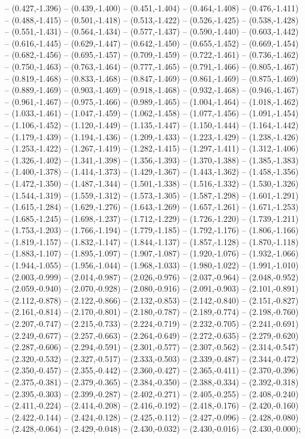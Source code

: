 -- (0.427,-1.396) -- (0.439,-1.400) -- (0.451,-1.404) -- (0.464,-1.408) -- (0.476,-1.411) -- (0.488,-1.415) -- (0.501,-1.418) -- (0.513,-1.422) -- (0.526,-1.425) -- (0.538,-1.428) -- (0.551,-1.431) -- (0.564,-1.434) -- (0.577,-1.437) -- (0.590,-1.440) -- (0.603,-1.442) -- (0.616,-1.445) -- (0.629,-1.447) -- (0.642,-1.450) -- (0.655,-1.452) -- (0.669,-1.454) -- (0.682,-1.456) -- (0.695,-1.457) -- (0.709,-1.459) -- (0.722,-1.461) -- (0.736,-1.462) -- (0.750,-1.463) -- (0.763,-1.464) -- (0.777,-1.465) -- (0.791,-1.466) -- (0.805,-1.467) -- (0.819,-1.468) -- (0.833,-1.468) -- (0.847,-1.469) -- (0.861,-1.469) -- (0.875,-1.469) -- (0.889,-1.469) -- (0.903,-1.469) -- (0.918,-1.468) -- (0.932,-1.468) -- (0.946,-1.467) -- (0.961,-1.467) -- (0.975,-1.466) -- (0.989,-1.465) -- (1.004,-1.464) -- (1.018,-1.462) -- (1.033,-1.461) -- (1.047,-1.459) -- (1.062,-1.458) -- (1.077,-1.456) -- (1.091,-1.454) -- (1.106,-1.452) -- (1.120,-1.449) -- (1.135,-1.447) -- (1.150,-1.444) -- (1.164,-1.442) -- (1.179,-1.439) -- (1.194,-1.436) -- (1.209,-1.433) -- (1.223,-1.429) -- (1.238,-1.426) -- (1.253,-1.422) -- (1.267,-1.419) -- (1.282,-1.415) -- (1.297,-1.411) -- (1.312,-1.406) -- (1.326,-1.402) -- (1.341,-1.398) -- (1.356,-1.393) -- (1.370,-1.388) -- (1.385,-1.383) -- (1.400,-1.378) -- (1.414,-1.373) -- (1.429,-1.367) -- (1.443,-1.362) -- (1.458,-1.356) -- (1.472,-1.350) -- (1.487,-1.344) -- (1.501,-1.338) -- (1.516,-1.332) -- (1.530,-1.326) -- (1.544,-1.319) -- (1.559,-1.312) -- (1.573,-1.305) -- (1.587,-1.298) -- (1.601,-1.291) -- (1.615,-1.284) -- (1.629,-1.276) -- (1.643,-1.269) -- (1.657,-1.261) -- (1.671,-1.253) -- (1.685,-1.245) -- (1.698,-1.237) -- (1.712,-1.229) -- (1.726,-1.220) -- (1.739,-1.211) -- (1.753,-1.203) -- (1.766,-1.194) -- (1.779,-1.185) -- (1.792,-1.176) -- (1.806,-1.166) -- (1.819,-1.157) -- (1.832,-1.147) -- (1.844,-1.137) -- (1.857,-1.128) -- (1.870,-1.118) -- (1.883,-1.107) -- (1.895,-1.097) -- (1.907,-1.087) -- (1.920,-1.076) -- (1.932,-1.066) -- (1.944,-1.055) -- (1.956,-1.044) -- (1.968,-1.033) -- (1.980,-1.022) -- (1.991,-1.010) -- (2.003,-0.999) -- (2.014,-0.987) -- (2.026,-0.976) -- (2.037,-0.964) -- (2.048,-0.952) -- (2.059,-0.940) -- (2.070,-0.928) -- (2.080,-0.916) -- (2.091,-0.903) -- (2.101,-0.891) -- (2.112,-0.878) -- (2.122,-0.866) -- (2.132,-0.853) -- (2.142,-0.840) -- (2.151,-0.827) -- (2.161,-0.814) -- (2.170,-0.801) -- (2.180,-0.787) -- (2.189,-0.774) -- (2.198,-0.760) -- (2.207,-0.747) -- (2.215,-0.733) -- (2.224,-0.719) -- (2.232,-0.705) -- (2.241,-0.691) -- (2.249,-0.677) -- (2.257,-0.663) -- (2.264,-0.649) -- (2.272,-0.635) -- (2.279,-0.620) -- (2.287,-0.606) -- (2.294,-0.591) -- (2.301,-0.577) -- (2.307,-0.562) -- (2.314,-0.547) -- (2.320,-0.532) -- (2.327,-0.517) -- (2.333,-0.503) -- (2.339,-0.487) -- (2.344,-0.472) -- (2.350,-0.457) -- (2.355,-0.442) -- (2.360,-0.427) -- (2.365,-0.411) -- (2.370,-0.396) -- (2.375,-0.381) -- (2.379,-0.365) -- (2.384,-0.350) -- (2.388,-0.334) -- (2.392,-0.318) -- (2.395,-0.303) -- (2.399,-0.287) -- (2.402,-0.271) -- (2.405,-0.255) -- (2.408,-0.240) -- (2.411,-0.224) -- (2.414,-0.208) -- (2.416,-0.192) -- (2.418,-0.176) -- (2.420,-0.160) -- (2.422,-0.144) -- (2.424,-0.128) -- (2.425,-0.112) -- (2.427,-0.096) -- (2.428,-0.080) -- (2.428,-0.064) -- (2.429,-0.048) -- (2.430,-0.032) -- (2.430,-0.016) -- (2.430,-0.000);
